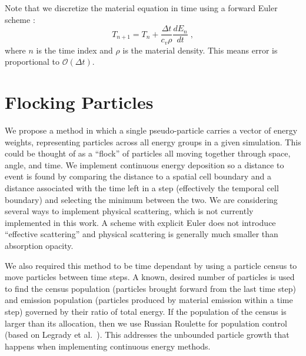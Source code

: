 Note that we discretize the material equation in time using a forward Euler scheme \cite{mc2018}:
\begin{equation}
    T_{n+1} = T_{n} + \frac{\Delta t}{c_{v} \rho}\frac{dE_{n}}{dt} \;,
\end{equation}
where $n$ is the time index and $\rho$ is the material density. 
This means error is proportional to $\mathcal{O}(\Delta t)$.
\section{Flocking Particles}
We propose a method in which a single pseudo-particle carries a vector of energy weights, representing particles across all energy groups in a given simulation.
This could be thought of as a ``flock'' of particles all moving together through space, angle, and time. 
We implement continuous energy deposition so a distance to event is found by comparing the distance to a spatial cell boundary and a distance associated with the time left in a step (effectively the temporal cell boundary) and selecting the minimum between the two.
We are considering several ways to implement physical scattering, which is not currently implemented in this work. 
A scheme with explicit Euler does not introduce ``effective scattering'' and physical scattering is generally much smaller than absorption opacity.


We also required this method to be time dependant by using a particle census to move particles between time steps.
A known, desired number of particles is used to find the census population (particles brought forward from the last time step) and emission population (particles produced by material emission within a time step) governed by their ratio of total energy.
If the population of the census is larger than its allocation, then we use Russian Roulette for population control (based on Legrady et al.~\cite{Legrady2020}).
This addresses the unbounded particle growth that happens when implementing continuous energy methods.

